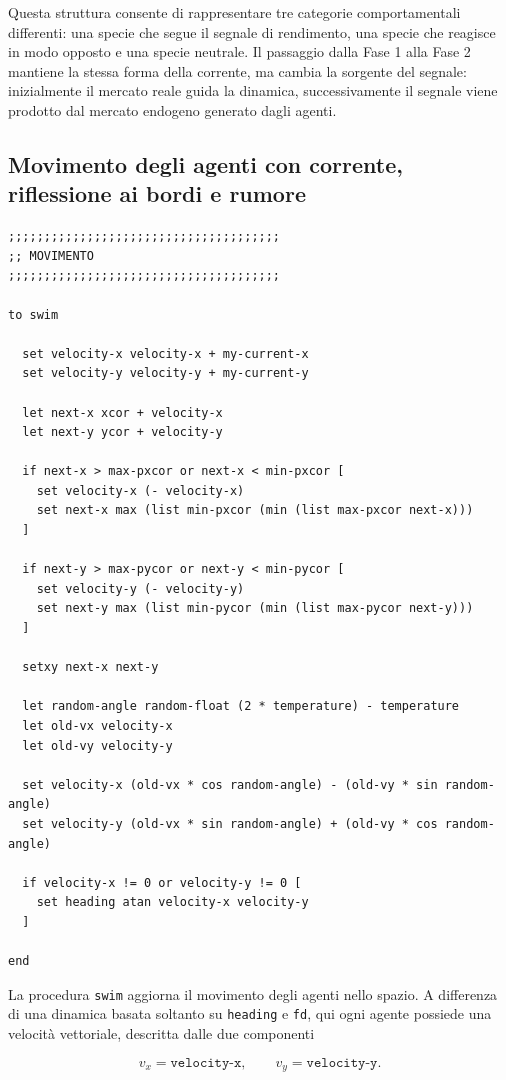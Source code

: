 Questa struttura consente di rappresentare tre categorie comportamentali
differenti: una specie che segue il segnale di rendimento, una specie che reagisce
in modo opposto e una specie neutrale. Il passaggio dalla Fase 1 alla Fase 2
mantiene la stessa forma della corrente, ma cambia la sorgente del segnale:
inizialmente il mercato reale guida la dinamica, successivamente il segnale viene
prodotto dal mercato endogeno generato dagli agenti.

\subsection{Movimento degli agenti con corrente, riflessione ai bordi e rumore}

\begin{lstlisting}[caption={Procedura di movimento degli agenti}]
;;;;;;;;;;;;;;;;;;;;;;;;;;;;;;;;;;;;;;
;; MOVIMENTO
;;;;;;;;;;;;;;;;;;;;;;;;;;;;;;;;;;;;;;

to swim

  set velocity-x velocity-x + my-current-x
  set velocity-y velocity-y + my-current-y

  let next-x xcor + velocity-x
  let next-y ycor + velocity-y

  if next-x > max-pxcor or next-x < min-pxcor [
    set velocity-x (- velocity-x)
    set next-x max (list min-pxcor (min (list max-pxcor next-x)))
  ]

  if next-y > max-pycor or next-y < min-pycor [
    set velocity-y (- velocity-y)
    set next-y max (list min-pycor (min (list max-pycor next-y)))
  ]

  setxy next-x next-y

  let random-angle random-float (2 * temperature) - temperature
  let old-vx velocity-x
  let old-vy velocity-y

  set velocity-x (old-vx * cos random-angle) - (old-vy * sin random-angle)
  set velocity-y (old-vx * sin random-angle) + (old-vy * cos random-angle)

  if velocity-x != 0 or velocity-y != 0 [
    set heading atan velocity-x velocity-y
  ]

end
\end{lstlisting}

La procedura \texttt{swim} aggiorna il movimento degli agenti nello spazio. A
differenza di una dinamica basata soltanto su \texttt{heading} e \texttt{fd}, qui
ogni agente possiede una velocità vettoriale, descritta dalle due componenti

\[
v_x = \texttt{velocity-x},
\qquad
v_y = \texttt{velocity-y}.
\]

